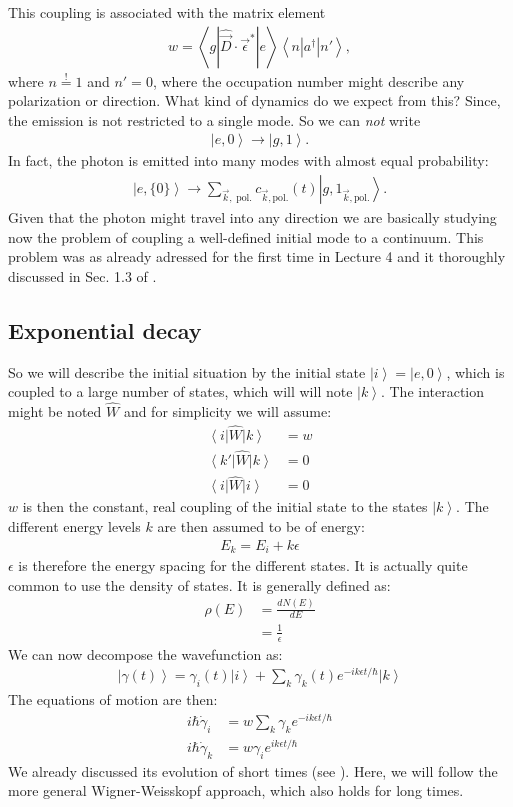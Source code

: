 \documentclass[10pt]{article}
\let\cite\citep
\providecommand\citep{\cite}
\newcommand{\bra}[1]{\ensuremath{\left\langle#1\right|}}
\newcommand{\ket}[1]{\ensuremath{\left|#1\right\rangle}}
\newcommand{\braket}[1]{\ensuremath{\left\langle#1\right\rangle}}
\begin{document}
This coupling is associated with the matrix element
%
\begin{align}
w = \braket{g|\hat{\vec{D}} \cdot \vec{\epsilon}^*|e} \braket{n|a^\dag|n'},
\end{align}
%
where $n\overset{!}{=} 1$ and $n'=0$, where the occupation number might describe any polarization or direction. What kind of dynamics do we expect from this? Since, the emission is not restricted to a single mode. So we can \emph{not} write
\begin{align}
\ket{e,0} \rightarrow \ket{g,1}.
\end{align}
%
In fact, the photon is emitted into many modes with almost equal probability:
\begin{align}
\ket{e,\{ 0 \}} \rightarrow \sum\limits_{\vec{k},\;\text{pol.}} c_{\vec{k},\text{pol.}} (t) \ket{g,1_{\vec{k},\text{pol.}}}.
\end{align}
Given that the photon might travel into any direction we are basically studying now the problem of coupling a well-defined initial mode to a continuum.  This problem was as already adressed for the first time in Lecture 4 \cite{Jendrzejewski} and it thoroughly discussed in Sec. 1.3 of \cite{grynberg}.

\subsection{Exponential decay}
So we will describe the initial situation by the initial state $\ket{i} = \ket{e,0}$, which is coupled to a large number of states, which will will note $\ket{k}$. The interaction might be noted $\hat{W}$ and for simplicity we will assume:
\begin{align}
\bra{i}\hat{W}\ket{k} &= w\\
\bra{k'}\hat{W}\ket{k} &= 0\\
\bra{i}\hat{W}\ket{i} &= 0
\end{align}
$w$ is then the constant, real coupling of the initial state to the  states $\ket{k}$. The different energy levels $k$ are then assumed to be of energy:
\begin{align}
E_k = E_i +k\epsilon
\end{align}
$\epsilon$ is therefore the energy spacing for the different states. It is actually quite common to use the density of states.
It is generally defined as:
\begin{align}
\rho(E) &= \frac{dN(E)}{dE}\\
&= \frac{1}{\epsilon}
\end{align}
We can now decompose the wavefunction as:
\begin{align}
\ket{\gamma(t)}=\gamma_i(t)\ket{i} +\sum_k \gamma_k(t) e^{-ik\epsilon t/\hbar}\ket{k} 
\end{align}
The equations of motion are then:
\begin{align}
i\hbar \dot{\gamma}_i &= w\sum_k \gamma_k e^{-ik\epsilon t/\hbar}\\
i\hbar \dot{\gamma}_k &= w \gamma_i  e^{ik\epsilon t/\hbar}
\end{align}
We already discussed its evolution of short times (see \cite{Jendrzejewski}). Here, we will follow the more general Wigner-Weisskopf approach, which also holds for long times. 
\end{document}
